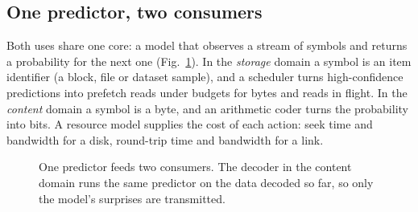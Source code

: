 \documentclass[conference]{IEEEtran}
\begin{document}
\subsection{One predictor, two consumers}\label{sec:framework}
Both uses share one core: a model that observes a stream of symbols and returns a probability for the next one (Fig.~\ref{fig:arch}). In the \emph{storage} domain a symbol is an item identifier (a block, file or dataset sample), and a scheduler turns high-confidence predictions into prefetch reads under budgets for bytes and reads in flight. In the \emph{content} domain a symbol is a byte, and an arithmetic coder turns the probability into bits. A resource model supplies the cost of each action: seek time and bandwidth for a disk, round-trip time and bandwidth for a link.

\begin{figure}[t]
\centering
{}
\caption{One predictor feeds two consumers. The decoder in the content domain runs the same predictor on the data decoded so far, so only the model's surprises are transmitted.}
\label{fig:arch}
\end{figure}
\end{document}
